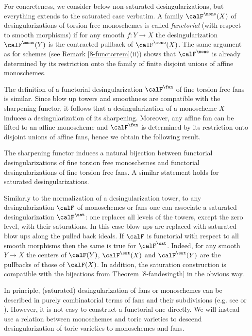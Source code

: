 \documentclass[10pt]{../fichiers-configuration-latex/smfart}
\begin{document}
For concreteness, we consider below non-saturated desingularizations,
but everything extends to the saturated case verbatim. A family
$\calF^\mono(X)$ of desingularizations of torsion free monoschemes
is called {\em functorial} (with respect to smooth morphisms) if for
any smooth $f{\colon}Y\to X$ the desingularization $\calF^\mono(Y)$
is the contracted pullback of $\calF^\mono(X)$. The same argument
as for schemes (see Remark \ref{8-functorrem}(ii)) shows that
$\calF^\mono$ is already determined by its restriction onto the
family of finite disjoint unions of affine monoschemes.

The definition of a functorial desingularization $\calF^\fan$ of fine
torsion free fans is similar. Since blow up towers and smoothness
are compatible with the sharpening functor, it follows that a
desingularization of a monoscheme $X$ induces a desingularization of
its sharpening. Moreover, any affine fan can be lifted to an affine
monoscheme and $\calF^\fan$ is determined by its restriction onto
disjoint unions of affine fans, hence we obtain the following result.

\begin{theorem2}\label{8-fandesingth} The sharpening functor
induces a natural bijection between functorial desingularizations
of fine torsion free monoschemes and functorial desingularizations
of fine torsion free fans. A similar statement holds for saturated
desingularizations.  \end{theorem2}

\begin{remark2}\label{8-satdesrem} Similarly to the normalization
of a desingularization tower, to any desingularization $\calF$ of
monoschemes or fans one can associate a saturated desingularization
$\calF^\sat$: one replaces all levels of the towers, except the zero
level, with their saturations. In this case blow ups are replaced
with saturated blow ups along the pulled back ideals. If $\calF$
is functorial with respect to all smooth morphisms then the same is
true for $\calF^\sat$. Indeed, for any smooth $Y\to X$ the centers
of $\calF(Y)$, $\calF^\sat(X)$ and $\calF^\sat(Y)$ are the pullbacks
of those of $\calF(X)$. In addition, the saturation construction
is compatible with the bijections from Theorem \ref{8-fandesingth}
in the obvious way.  \end{remark2}

\begin{remark2}\label{8-fandesrem} In principle, (saturated)
desingularization of fans or monoschemes can be described in
purely combinatorial terms of fans and their subdivisions (e.g. see
\cite[9.6]{Toric@Kato} or \cite[\S4]{Toric@Niziol}). However, it is
not easy to construct a functorial one directly. We will instead
use a relation between monoschemes and toric varieties to descend
desingularization of toric varieties to monoschemes and fans.
\end{remark2}
\end{document}
